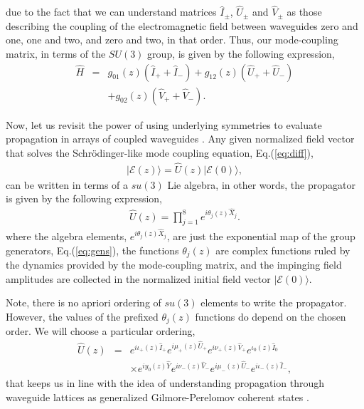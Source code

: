 \documentclass[9pt,twocolumn,twoside]{osajnl}
\begin{document}
due to the fact that we can understand matrices $\hat{I}_{\pm}$, $\hat{U}_{\pm}$ and $\hat{V}_{\pm}$ as those describing the coupling of the electromagnetic field between waveguides zero and one, one and two, and zero and two, in that order.
Thus, our mode-coupling matrix, in terms of the $SU(3)$ group, is given by the following expression,
\begin{eqnarray}
	\hat{H} &=& g_{01}(z) \left( \hat{I}_{+} + \hat{I}_{-} \right) + g_{12}(z) \left( \hat{U}_{+} + \hat{U}_{-} \right)\nonumber \\
	 & & +  g_{02}(z) \left( \hat{V}_{+} + \hat{V}_{-} \right).
\end{eqnarray}


Now, let us revisit the power of using underlying symmetries to evaluate propagation in arrays of coupled waveguides \cite{VillanuevaVergara2015p}. 
Any given normalized field vector that solves the Schr\"odinger-like mode coupling equation, Eq.(\ref{eq:diff}), 
\begin{eqnarray}
	\vert \mathcal{E}(z) \rangle = \hat{U}(z)  \vert 	\mathcal{E}(0) \rangle, \label{eq:sol}
\end{eqnarray}
can be written in terms of a $su(3)$ Lie algebra, in other words, the propagator is given by the following expression, 
\begin{eqnarray}
	\hat{U}(z) = \prod_{j=1}^{8} e^{i \theta_{j}(z) \hat{X}_{j}}.
\end{eqnarray}
where the algebra elements, $e^{i \theta_{j}(z) \hat{X}_{j}}$, are just the exponential map of the group generators, Eq.(\ref{eq:gens}), the functions $\theta_{j}(z)$ are complex functions ruled by the dynamics provided by the mode-coupling matrix, and the impinging field amplitudes are collected in the normalized initial field vector $\vert \mathcal{E}(0) \rangle$.

Note, there is no apriori ordering of $su(3)$ elements to write the propagator. 
However, the values of the prefixed $\theta_{j}(z)$ functions do depend on the chosen order.
We will choose a particular ordering,
\begin{eqnarray}
\hat{U}(z) &=& e^{i \iota_{+}(z) \hat{I}_{+}} e^{i \mu_{+}(z) \hat{U}_{+}}  
e^{i \nu_{+}(z) \hat{V}_{+}} e^{ \iota_{0}(z) \hat{I}_{0}} \nonumber \\ 
&& \times e^{i y_{0}(z) \hat{Y}}  e^{i \nu_{-}(z) \hat{V}_{-}} e^{i \mu_{-}(z) \hat{U}_{-}} e^{i \iota_{-}(z) \hat{I}_{-}}, \label{eq:prop}
\end{eqnarray}
that keeps us in line with the idea of understanding propagation through waveguide lattices as generalized Gilmore-Perelomov coherent states \cite{VillanuevaVergara2015p}.
\end{document}
